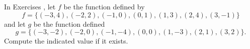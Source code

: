 {\noindent In Exercises}
{, let $f$ be the function defined by \[f = \{(-3, 4), (-2, 2), (-1, 0), (0, 1), (1, 3), (2, 4), (3, -1)\}\] and let $g$ be the function defined \[g = \{(-3, -2), (-2, 0), (-1, -4), (0, 0), (1, -3), (2, 1), (3, 2)\}.\] Compute the indicated value if it exists.
}
